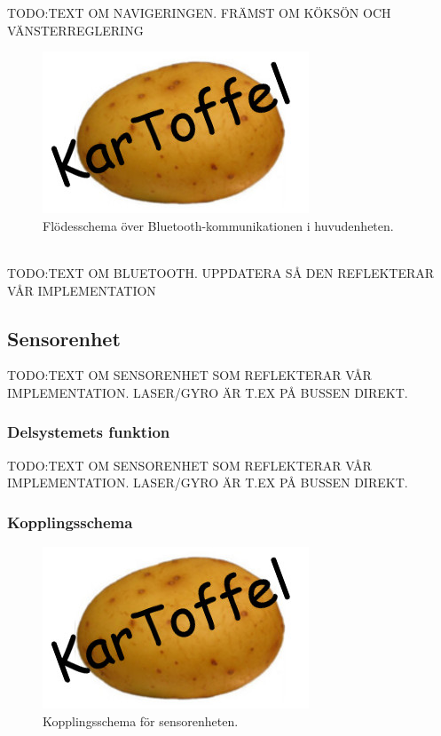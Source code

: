 \documentclass{article}
\begin{document}
TODO:TEXT OM NAVIGERINGEN. FRÄMST OM KÖKSÖN OCH VÄNSTERREGLERING

\begin{figure}[H]
\centering
\includegraphics[scale=0.45]{Logo}
\caption{Flödesschema över Bluetooth-kommunikationen i huvudenheten.}
\label{fig:Kommunikation_huvudenhet_v2}
\end{figure}
\ \\

TODO:TEXT OM BLUETOOTH. UPPDATERA SÅ DEN REFLEKTERAR VÅR IMPLEMENTATION

\subsection{Sensorenhet}
TODO:TEXT OM SENSORENHET SOM REFLEKTERAR VÅR IMPLEMENTATION. LASER/GYRO ÄR T.EX PÅ BUSSEN DIREKT.

\subsubsection{Delsystemets funktion}
TODO:TEXT OM SENSORENHET SOM REFLEKTERAR VÅR IMPLEMENTATION. LASER/GYRO ÄR T.EX PÅ BUSSEN DIREKT.

\subsubsection{Kopplingsschema}
\begin{figure}[H]
\centering
\includegraphics[scale=0.6]{Logo}
\caption{Kopplingsschema för sensorenheten.}
\label{fig:sensorenhet_kopplingsschema}
\end{figure}
\end{document}
